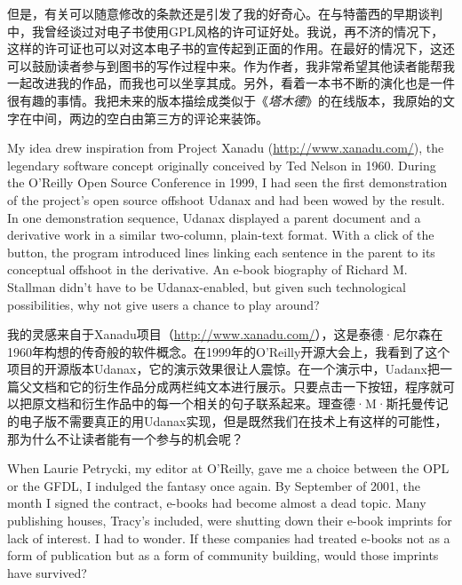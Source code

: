 \ifdefined\chs
但是，有关可以随意修改的条款还是引发了我的好奇心。在与特蕾西的早期谈判中，我曾经谈过对电子书使用GPL风格的许可证好处。我说，再不济的情况下，这样的许可证也可以对这本电子书的宣传起到正面的作用。在最好的情况下，这还可以鼓励读者参与到图书的写作过程中来。作为作者，我非常希望其他读者能帮我一起改进我的作品，而我也可以坐享其成。另外，看着一本书不断的演化也是一件很有趣的事情。我把未来的版本描绘成类似于《\textit{塔木德}》的在线版本，我原始的文字在中间，两边的空白由第三方的评论来装饰。
\fi

\ifdefined\eng
My idea drew inspiration from Project Xanadu (\url{http://www.xanadu.com/}), the legendary software concept originally conceived by Ted Nelson in 1960. During the O'Reilly Open Source Conference in 1999, I had seen the first demonstration of the project's open source offshoot Udanax and had been wowed by the result. In one demonstration sequence, Udanax displayed a parent document and a derivative work in a similar two-column, plain-text format. With a click of the button, the program introduced lines linking each sentence in the parent to its conceptual offshoot in the derivative. An e-book biography of Richard M. Stallman didn't have to be Udanax-enabled, but given such technological possibilities, why not give users a chance to play around?
\fi

\ifdefined\chs
我的灵感来自于Xanadu项目（\url{http://www.xanadu.com/}），这是泰德·尼尔森在1960年构想的传奇般的软件概念。在1999年的O'Reilly开源大会上，我看到了这个项目的开源版本Udanax，它的演示效果很让人震惊。在一个演示中，Uadanx把一篇父文档和它的衍生作品分成两栏纯文本进行展示。只要点击一下按钮，程序就可以把原文档和衍生作品中的每一个相关的句子联系起来。理查德·M·斯托曼传记的电子版不需要真正的用Udanax实现，但是既然我们在技术上有这样的可能性，那为什么不让读者能有一个参与的机会呢？
\fi

\ifdefined\eng
When Laurie Petrycki, my editor at O'Reilly, gave me a choice between the OPL or the GFDL, I indulged the fantasy once again. By September of 2001, the month I signed the contract, e-books had become almost a dead topic. Many publishing houses, Tracy's included, were shutting down their e-book imprints for lack of interest. I had to wonder. If these companies had treated e-books not as a form of publication but as a form of community building, would those imprints have survived?
\fi

